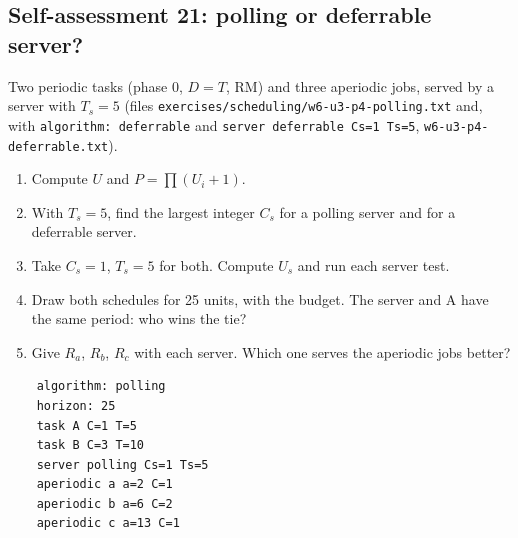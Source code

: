 \subsection*{Self-assessment 21: polling or deferrable server?}
Two periodic tasks (phase 0, $D = T$, RM) and three aperiodic jobs, served by a server with $T_s = 5$ (files \texttt{exercises/scheduling/w6-u3-p4-polling.txt} and, with \texttt{algorithm: deferrable} and \texttt{server deferrable Cs=1 Ts=5}, \texttt{w6-u3-p4-deferrable.txt}).
\begin{enumerate}
    \item Compute $U$ and $P = \prod (U_i + 1)$.
    \item With $T_s = 5$, find the largest integer $C_s$ for a polling server and for a deferrable server.
    \item Take $C_s = 1$, $T_s = 5$ for both. Compute $U_s$ and run each server test.
    \item Draw both schedules for 25 units, with the budget. The server and A have the same period: who wins the tie?
    \item Give $R_a$, $R_b$, $R_c$ with each server. Which one serves the aperiodic jobs better?
\end{enumerate}

\begin{lstlisting}
    algorithm: polling
    horizon: 25
    task A C=1 T=5
    task B C=3 T=10
    server polling Cs=1 Ts=5
    aperiodic a a=2 C=1
    aperiodic b a=6 C=2
    aperiodic c a=13 C=1
\end{lstlisting}

